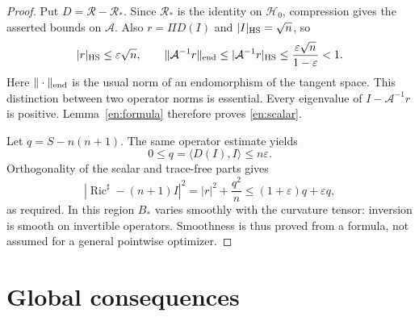\documentclass[12pt]{amsart}
\theoremstyle{definition}
\theoremstyle{remark}
\numberwithin{equation}{section}
\DeclareMathOperator{\Ric}{Ric}
\theoremstyle{plain}
\theoremstyle{remark}
\theoremstyle{definition}
\begin{document}
\begin{proof}
Put $D=\mathscr R-\mathscr R_*$. Since $\mathscr R_*$ is the identity on
$\mathcal H_0$, compression gives the asserted bounds on $\mathcal A$.
Also $r=\Pi D(I)$ and $|I|_{\rm HS}=\sqrt n$, so
\[
 |r|_{\rm HS}\leq\varepsilon\sqrt n,
 \qquad \|\mathcal A^{-1}r\|_{\rm end}
 \leq|\mathcal A^{-1}r|_{\rm HS}
 \leq\frac{\varepsilon\sqrt n}{1-\varepsilon}<1.
\]
Here $\|\cdot\|_{\rm end}$ is the usual norm of an endomorphism of the
tangent space. This distinction between two operator norms is essential.
Every eigenvalue of $I-\mathcal A^{-1}r$ is positive. Lemma~\ref{en:formula}
therefore proves \eqref{en:scalar}.

Let $q=S-n(n+1)$. The same operator estimate yields
\[
 0\leq q=\langle D(I),I\rangle\leq n\varepsilon.
\]
Orthogonality of the scalar and trace-free parts gives
\[
 |\Ric^\sharp-(n+1)I|^2=|r|^2+\frac{q^2}{n}
 \leq(1+\varepsilon)q+\varepsilon q,
\]
as required. In this region $B_*$ varies smoothly with the curvature
tensor: inversion is smooth on invertible operators. Smoothness is thus
proved from a formula, not assumed for a general pointwise optimizer.
\end{proof}

\section{Global consequences}\label{en:global}
\end{document}
